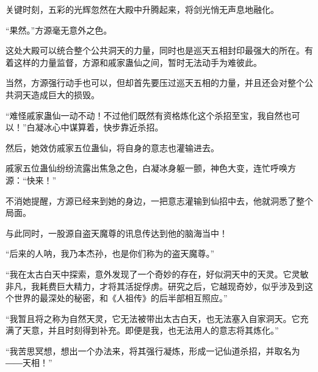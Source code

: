 \begin{this_body}
关键时刻，五彩的光辉忽然在大殿中升腾起来，将剑光悄无声息地融化。

“果然。”方源毫无意外之色。

这处大殿可以统合整个公共洞天的力量，同时也是巡天五相封印最强大的所在。有着这样的力量监督，方源和戚家蛊仙之间，暂时无法动手为难彼此。

当然，方源强行动手也可以，但却首先要压过巡天五相的力量，并且还会对整个公共洞天造成巨大的损毁。

“难怪戚家蛊仙一动不动！不过他们既然有资格炼化这个杀招至宝，我自然也可以！”白凝冰心中谋算着，快步靠近杀招。

然后，她效仿戚家五位蛊仙，将自身的意志也灌输进去。

戚家五位蛊仙纷纷流露出焦急之色，白凝冰身躯一颤，神色大变，连忙呼唤方源：“快来！”

不消她提醒，方源已经来到她的身边，一把意志灌输到仙招中去，他就洞悉了整个局面。

与此同时，一股源自盗天魔尊的讯息传达到他的脑海当中！

“后来的人呐，我乃本杰孙，也是你们称为的盗天魔尊。”

“我在太古白天中探索，意外发现了一个奇妙的存在，好似洞天中的天灵。它灵敏非凡，我耗费巨大精力，才将其活捉俘虏。研究之后，它越现奇妙，似乎涉及到这个世界的最深处的秘密，和《人祖传》的后半部相互照应。”

“我暂且将之称为自然天灵，它无法被带出太古白天，也无法塞入自家洞天。它充满了天意，并且时刻得到补充。即便是我，也无法用人的意志将其炼化。”

“我苦思冥想，想出一个办法来，将其强行凝炼，形成一记仙道杀招，并取名为――天相！”

\end{this_body}

